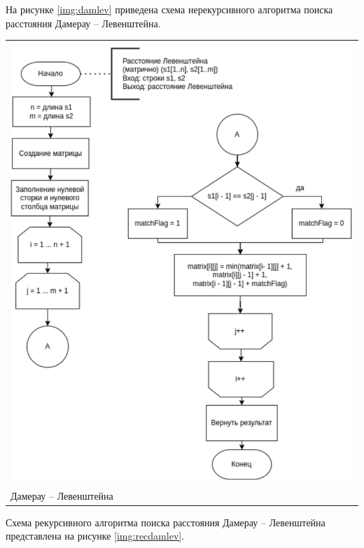 На рисунке \ref{img:damlev} приведена схема нерекурсивного алгоритма поиска расстояния Дамерау -- Левенштейна.

\begin{table}[h!]
	\centering
	\begin{tabular}{p{1\linewidth}}
		\centering
		\includegraphics[width=0.8\linewidth]{include/damlev.pdf}
		\captionof{figure}{Схема нерекурсивного алгоритма поиска расстояния \\Дамерау -- Левенштейна}
		\label{img:damlev}
	\end{tabular}
\end{table}

Схема рекурсивного алгоритма поиска расстояния Дамерау -- Левенштейна представлена на рисунке \ref{img:recdamlev}.


